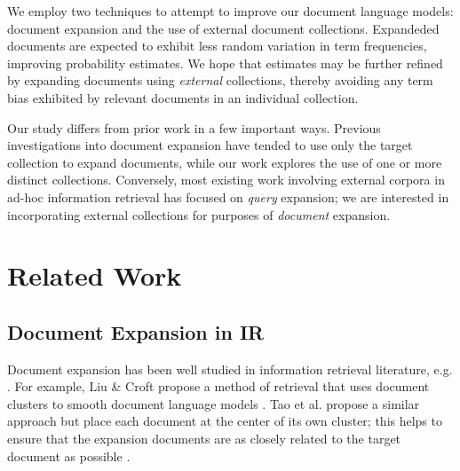 \documentclass{sig-alternate}
\begin{document}
We employ two techniques to attempt to improve our document language models: document expansion and the use of external document collections. Expandeded documents are expected to exhibit less random variation in term frequencies, improving probability estimates. We hope that estimates may be further refined by expanding documents using \textit{external} collections, thereby avoiding any term bias exhibited by relevant documents in an individual collection.



Our study differs from prior work in a few important ways. Previous investigations into document expansion have tended to use only the target collection to expand documents, while our work explores the use of one or more distinct collections. Conversely, most existing work involving external corpora in ad-hoc information retrieval has focused on \textit{query} expansion; we are interested in incorporating external collections for purposes of \textit{document} expansion.

\section{Related Work}\label{section.related}

\subsection{Document Expansion in IR}\label{section.related.ir}

Document expansion has been well studied in information retrieval literature, e.g. \cite{Liu2004, Singhal1999, Tao2006, Wei2006}. For example, Liu \& Croft propose a method of retrieval that uses document clusters to smooth document language models \cite{Liu2004}. Tao et al. propose a similar approach but place each document at the center of its own cluster; this helps to ensure that the expansion documents are as closely related to the target document as possible \cite{Tao2006}.
\end{document}
